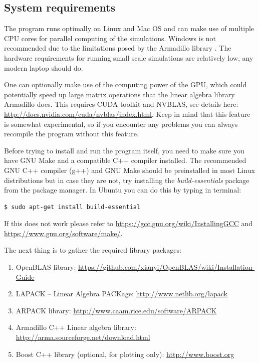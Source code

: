\documentclass[english,12pt,a4paper,pdftex,sci,utf8]{aaltothesis}
\begin{document}
\subsection{System requirements}
\label{sec:req}
The program runs optimally on Linux and Mac OS and can make use of multiple CPU cores for parallel computing of the simulations. Windows is not recommended due to the limitations posed by the Armadillo library \cite{arma}. The hardware requirements for running small scale simulations are relatively low, any modern laptop should do.
\par One can optionally make use of the computing power of the GPU, which could potentially speed up large matrix operations that the linear algebra library Armadillo does. This requires CUDA toolkit and NVBLAS, see details here: \url{http://docs.nvidia.com/cuda/nvblas/index.html}. Keep in mind that this feature is somewhat experimental, so if you encounter any problems you can always recompile the program without this feature.
\par Before trying to install and run the program itself, you need to make sure you have GNU Make and a compatible C++ compiler installed. The recommended GNU C++ compiler (g++) and GNU Make should be preinstalled in most Linux distributions but in case they are not, try installing the \textit{build-essentials} package from the package manager. In Ubuntu you can do this by typing in terminal:
\begin{verbatim}
$ sudo apt-get install build-essential
\end{verbatim}
If this does not work please refer to \url{https://gcc.gnu.org/wiki/InstallingGCC} and \url{https://www.gnu.org/software/make/}. 
\par The next thing is to gather the required library packages:
\begin{enumerate}
\item OpenBLAS library: \url{https://github.com/xianyi/OpenBLAS/wiki/Installation-Guide}
\item LAPACK -- Linear Algebra PACKage: \url{http://www.netlib.org/lapack}
\item ARPACK library: \url{http://www.caam.rice.edu/software/ARPACK}
\item Armadillo C++ Linear algebra library: \url{http://arma.sourceforge.net/download.html} 
\item Boost C++ library (optional, for plotting only): \url{http://www.boost.org}
\end{enumerate}
\end{document}
